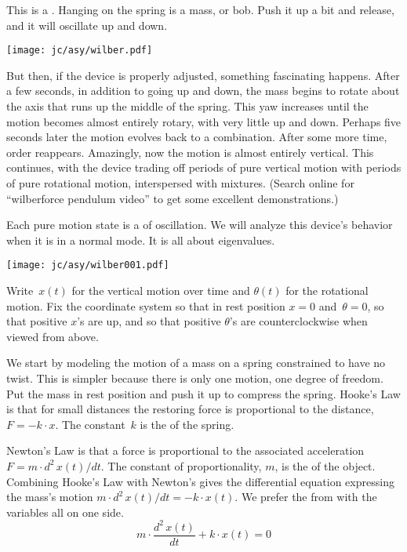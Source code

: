 
% 

This is a .
Hanging on the spring is a mass, or bob.
Push it up a bit and release, and it will oscillate up and down.
\begin{center}
  \texttt{[image: jc/asy/wilber.pdf]}
\end{center}
But then, if the device is properly adjusted, something fascinating happens.
After a few seconds, in addition to going up
and down, the mass begins to rotate
about the axis that runs up the middle of the spring.
This yaw increases until the motion  
becomes almost entirely rotary, with very little up and down.
Perhaps five seconds later the motion evolves back to a combination.
After some more time, order reappears.
Amazingly, now
the motion is almost entirely vertical.
This continues, with the device trading off
periods of pure vertical motion with periods of pure rotational motion,
interspersed with mixtures. 
(Search online for ``wilberforce pendulum video'' to get 
some excellent demonstrations.) 

Each pure motion state is a  of oscillation.
We will analyze this device's behavior when it is in a normal mode. 
It is all about eigenvalues.

\begin{center}
  \texttt{[image: jc/asy/wilber001.pdf]}
\end{center}

Write~$x(t)$ for the vertical motion over time and 
$\theta(t)$ for the rotational motion.
Fix the coordinate system so that in rest position $x=0$ and~$\theta=0$, 
so that positive $x$'s are up, and so that positive $\theta$'s
are counterclockwise when viewed from above.

We start by modeling the motion of a mass on a 
spring constrained to have no twist.
This is simpler because there is only one motion, one degree of freedom.
Put the mass in rest position and 
push it up to compress the spring.
Hooke's Law is that for small distances
the restoring force is 
proportional to the distance, $F=-k\cdot x$.
The constant~$k$ is the
 of the spring.

Newton's Law is that a force is proportional to the 
associated acceleration $F=m\cdot d^2\,x(t)/dt$.
The constant of proportionality, $m$, is the 
of the object.
Combining Hooke's Law with Newton's 
gives the differential equation expressing the 
mass's motion $m\cdot d^2\,x(t)/dt=-k\cdot x(t)$.
We prefer the from with the variables all on one side.
\begin{equation*}
  m\cdot \frac{d^2\,x(t)}{dt}+k\cdot x(t)=0
  \tag{$*$}
\end{equation*}

